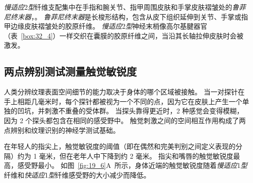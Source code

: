 \textit{慢适应}2\textit{型}纤维支配集中在手指和腕关节、指甲周围皮肤和手掌皮肤褶皱处的\textit{鲁菲尼终末器}，。
\textit{鲁菲尼终末器}是长梭形结构，包含从皮下组织延伸到关节、手掌或指甲边缘皮肤褶皱处的胶原纤维。
\textit{慢适应}2\textit{型}神经末梢像高尔基腱器官（表~\ref{box:32_4}）一样交织在囊膜的胶原纤维之间，当沿其长轴拉伸皮肤时会被激发。



\subsection{两点辨别测试测量触觉敏锐度}

人类分辨纹理表面空间细节的能力取决于身体的哪个区域被接触。
当一对探针在手上相距几毫米时，每个探针都被视为一个不同的点，因为它在皮肤上产生一个单独的凹坑，并刺激不重叠的受体群。
当探头靠得更近时，2 种感觉会变得模糊，因为 2 个探头都包含在相同的感受野中。
触觉刺激之间的空间相互作用构成了两点辨别和纹理识别的神经学测试基础。


在年轻人的指尖上，触觉敏锐度的阈值（即在偶然和完美判别之间定义表现的分隔）约为 1 毫米，但在老年人中下降到约 2 毫米。
指尖和嘴唇的触觉敏锐度最高，感受野最小。
如图~\ref{fig:19_6}A~所示，身体近端的触觉敏锐度随着\textit{慢适应}1\textit{型}纤维和\textit{快适应}1\textit{型}纤维感受野的大小减少而降低。


